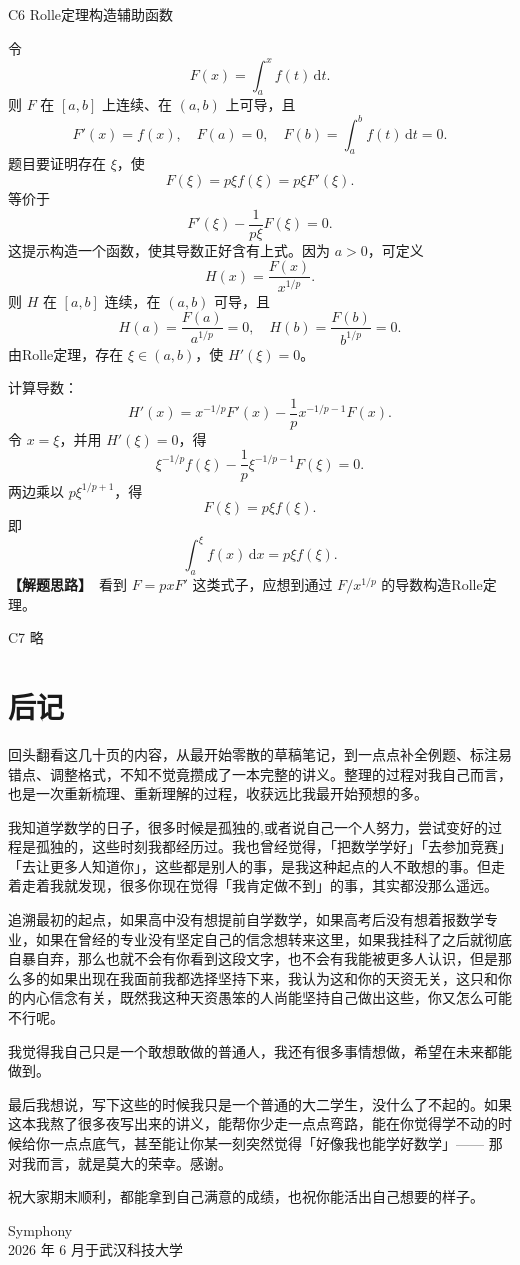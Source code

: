 \documentclass[UTF8,zihao=-4,openany]{ctexbook}
\newcommand{\dd}{\,\mathrm{d}}
\newcommand{\thinking}{\textcolor{mainblue}{\bfseries【解题思路】}}
\begin{document}
\begin{solutionbox}{C6 Rolle定理构造辅助函数}

令
\[
F(x)=\int_a^x f(t)\dd t.
\]
则 $F$ 在 $[a,b]$ 上连续、在 $(a,b)$ 上可导，且
\[
F'(x)=f(x),
\quad
F(a)=0,
\quad
F(b)=\int_a^bf(t)\dd t=0.
\]
题目要证明存在 $\xi$，使
\[
F(\xi)=p\xi f(\xi)=p\xi F'(\xi).
\]
等价于
\[
F'(\xi)-\frac{1}{p\xi}F(\xi)=0.
\]
这提示构造一个函数，使其导数正好含有上式。因为 $a>0$，可定义
\[
H(x)=\frac{F(x)}{x^{1/p}}.
\]
则 $H$ 在 $[a,b]$ 连续，在 $(a,b)$ 可导，且
\[
H(a)=\frac{F(a)}{a^{1/p}}=0,
\quad
H(b)=\frac{F(b)}{b^{1/p}}=0.
\]
由Rolle定理，存在 $\xi\in(a,b)$，使 $H'(\xi)=0$。

计算导数：
\[
H'(x)=x^{-1/p}F'(x)-\frac1p x^{-1/p-1}F(x).
\]
令 $x=\xi$，并用 $H'(\xi)=0$，得
\[
\xi^{-1/p}f(\xi)-\frac1p\xi^{-1/p-1}F(\xi)=0.
\]
两边乘以 $p\xi^{1/p+1}$，得
\[
F(\xi)=p\xi f(\xi).
\]
即
\[
\boxed{\int_a^\xi f(x)\dd x=p\xi f(\xi).}
\]
\thinking\ 看到 $F=p x F'$ 这类式子，应想到通过 $F/x^{1/p}$ 的导数构造Rolle定理。
\end{solutionbox}

\begin{solutionbox}{C7}
略
\end{solutionbox}

\backmatter
\chapter*{后记}
\qquad 回头翻看这几十页的内容，从最开始零散的草稿笔记，到一点点补全例题、标注易错点、调整格式，不知不觉竟攒成了一本完整的讲义。整理的过程对我自己而言，也是一次重新梳理、重新理解的过程，收获远比我最开始预想的多。\par
我知道学数学的日子，很多时候是孤独的,或者说自己一个人努力，尝试变好的过程是孤独的，这些时刻我都经历过。我也曾经觉得，「把数学学好」「去参加竞赛」「去让更多人知道你」，这些都是别人的事，是我这种起点的人不敢想的事。但走着走着我就发现，很多你现在觉得「我肯定做不到」的事，其实都没那么遥远。\par
追溯最初的起点，如果高中没有想提前自学数学，如果高考后没有想着报数学专业，如果在曾经的专业没有坚定自己的信念想转来这里，如果我挂科了之后就彻底自暴自弃，那么也就不会有你看到这段文字，也不会有我能被更多人认识，但是那么多的如果出现在我面前我都选择坚持下来，我认为这和你的天资无关，这只和你的内心信念有关，既然我这种天资愚笨的人尚能坚持自己做出这些，你又怎么可能不行呢。\par
我觉得我自己只是一个敢想敢做的普通人，我还有很多事情想做，希望在未来都能做到。\par
最后我想说，写下这些的时候我只是一个普通的大二学生，没什么了不起的。如果这本我熬了很多夜写出来的讲义，能帮你少走一点点弯路，能在你觉得学不动的时候给你一点点底气，甚至能让你某一刻突然觉得「好像我也能学好数学」—— 那对我而言，就是莫大的荣幸。感谢。\par
祝大家期末顺利，都能拿到自己满意的成绩，也祝你能活出自己想要的样子。
\vfill

\begin{flushright}
Symphony\\
2026 年 6 月于武汉科技大学
\end{flushright}
\end{document}
